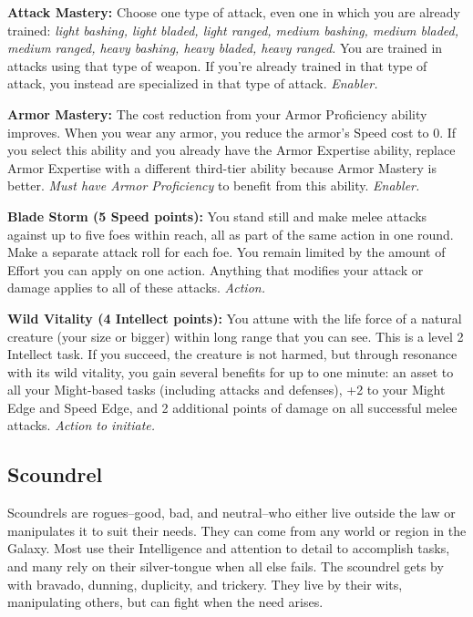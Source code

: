 \documentclass[a4paper,10pt,final,twocolumn,oneside]{book}
\newcommand{\itemAbility}[2]{\textcolor{25gray}{\textbullet\textbf{ #1:}}{ #2}\par}
\newcommand{\enabler}{\textit{ Enabler.}}
\newcommand{\action}{\textit{ Action.}}
\newcommand{\actionInit}{\textit{ Action to initiate.}}
\begin{document}
\itemAbility{Attack Mastery}{Choose one type of attack, even one in which you are already trained: \textit{light bashing, light bladed, light ranged, medium bashing, medium bladed, medium ranged, heavy bashing, heavy bladed, heavy ranged.} You are trained in attacks using that type of weapon. If you’re already trained in that type of attack, you instead are specialized in that type of attack.\enabler}

\itemAbility{Armor Mastery}{The cost reduction from your Armor Proficiency ability improves. When you wear any armor, you reduce the armor’s Speed cost to 0. If you select this ability and you already have the Armor Expertise ability, replace Armor Expertise with a different third-tier ability because Armor Mastery is better. \textit{Must have Armor Proficiency} to benefit from this ability.\enabler}

\itemAbility{Blade Storm (5 Speed points)}{You stand still and make melee attacks against up to five foes within reach, all as part of the same action in one round. Make a separate attack roll for each foe. You remain limited by the amount of Effort you can apply on one action. Anything that modifies your attack or damage applies to all of these attacks.\action}

\itemAbility{Wild Vitality (4 Intellect points)}{You attune with the life force of a natural creature (your size or bigger) within long range that you can see. This is a level 2 Intellect task. If you succeed, the creature is not harmed, but through resonance with its wild vitality, you gain several benefits for up to one minute: an asset to all your Might-based tasks (including attacks and defenses), +2 to your Might Edge and Speed Edge, and 2 additional points of damage on all successful melee attacks.\actionInit}

\clearpage


%
%
%
%
%
%
%
%
%
%
%
%
%
%
%
%
%
%
%


\subsection{Scoundrel} %
\label{sub:scoundrel}

Scoundrels are rogues--good, bad, and neutral--who either live outside the law or manipulates it to suit their needs. They can come from any world or region in the Galaxy. Most use their Intelligence and attention to detail to accomplish tasks, and many rely on their silver-tongue when all else fails. The scoundrel gets by with bravado, dunning, duplicity, and trickery. They live by their wits, manipulating others, but can fight when the need arises.
\end{document}
